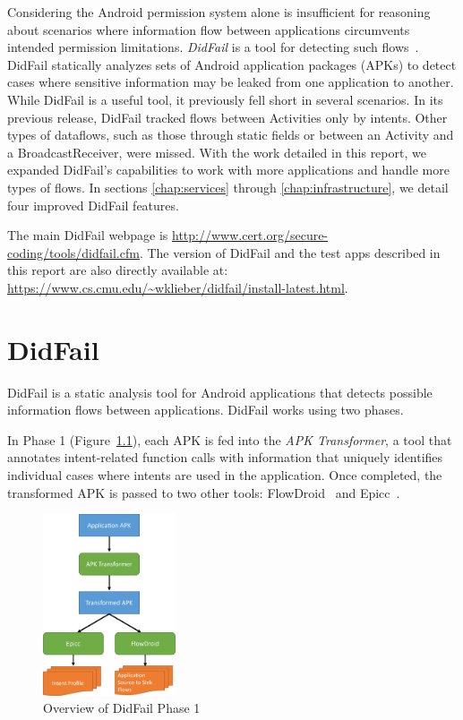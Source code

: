 Considering the Android permission system alone is insufficient for reasoning about scenarios where information flow between applications circumvents intended permission limitations. \emph{DidFail} is a tool for detecting such flows~\cite{didfail}. DidFail statically analyzes sets of Android application packages (APKs) to detect cases where sensitive information may be leaked from one application to another. While DidFail is a useful tool, it previously fell short in several scenarios. In its previous release, DidFail tracked flows between Activities only by intents. Other types of dataflows, such as those through static fields or between an Activity and a BroadcastReceiver, were missed. With the work detailed in this report, we expanded DidFail's capabilities to work with more applications and handle more types of flows. In sections \ref{chap:services} through \ref{chap:infrastructure}, we detail four improved DidFail features.

The main DidFail webpage is \url{http://www.cert.org/secure-coding/tools/didfail.cfm}.  The version of DidFail and the test apps described in this report are also directly available at: 
\\ \url{https://www.cs.cmu.edu/~wklieber/didfail/install-latest.html}.

\chapter{DidFail}

DidFail is a static analysis tool for Android applications that detects possible information flows between applications. DidFail works using two phases.

In Phase 1 (Figure~\ref{fig:overview_phase1}), each APK is fed into the \emph{APK Transformer}, a tool that annotates intent-related function calls with information that uniquely identifies individual cases where intents are used in the application. Once completed, the transformed APK is passed to two other tools: FlowDroid~\cite{flowdroid} and Epicc~\cite{epicc}.

\begin{figure}[h]
	\centering
	\includegraphics[width=0.35\textwidth]{didfail1.pdf}
	\caption{Overview of DidFail Phase 1}
	\label{fig:overview_phase1}
\end{figure}


